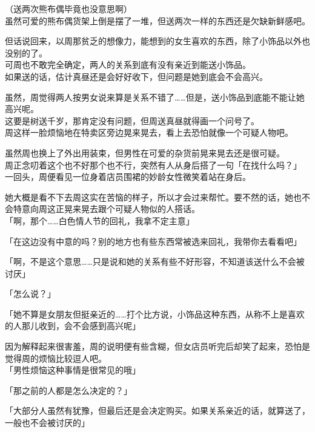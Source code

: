 （送两次熊布偶毕竟也没意思啊）\\

虽然可爱的熊布偶货架上倒是摆了一堆，但送两次一样的东西还是欠缺新鲜感吧。

但话说回来，以周那贫乏的想像力，能想到的女生喜欢的东西，除了小饰品以外也没别的了。\\

可周也不敢完全确定，两人的关系到底有没有亲近到能送小饰品。\\

如果送的话，估计真昼还是会好好收下，但问题是她到底会不会高兴。

虽然，周觉得两人按男女说来算是关系不错了……但是，送小饰品到底能不能让她高兴呢。\\

这要是树送千岁，那肯定没有问题，但周送真昼就得画一个问号了。\\

周这样一脸烦恼地在特卖区旁边晃来晃去，看上去恐怕就像一个可疑人物吧。

虽然周也换上了外出用装束，但男性在可爱的杂货前晃来晃去还是很可疑。\\

周正念叨着这个也不好那个也不行，突然有人从身后搭了一句「在找什么吗？」\\

一回头，周便看见一位身着店员围裙的妙龄女性微笑着站在身后。

她大概是看不下去周这实在苦恼的样子，所以才会过来帮忙。要不然的话，她也不会特意向周这正晃来晃去跟个可疑人物似的人搭话。\\

「啊，那个……白色情人节的回礼，我拿不定主意」

「在这边没有中意的吗？别的地方也有些东西常被选来回礼，我带你去看看吧」

「啊，不是这个意思……只是说和她的关系有些不好形容，不知道该送什么不会被讨厌」

「怎么说？」

「她不算是女朋友但挺亲近的……打个比方说，小饰品这种东西，从称不上是喜欢的人那儿收到，会不会感到高兴呢」

因为解释起来很害羞，周的说明便有些含糊，但女店员听完后却笑了起来，恐怕是觉得周的烦恼比较逗人吧。\\

「男性烦恼这种事情是很常见的哦」

「那之前的人都是怎么决定的？」

「大部分人虽然有犹豫，但最后还是会决定购买。如果关系亲近的话，就算送了，一般也不会被讨厌的」\\

